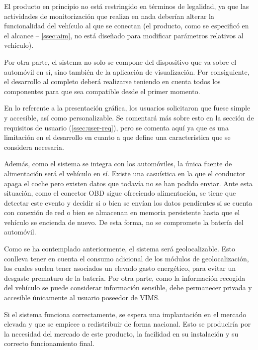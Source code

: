 El producto en principio no está restringido en términos de legalidad, ya que las
actividades de monitorización que realiza en nada deberían
alterar la funcionalidad del vehículo al que se conectan 
(el producto, como se especificó en el alcance
-- \ref{ssec:aim}, no está diseñado para modificar parámetros relativos al
vehículo).

Por otra parte, el sistema no solo se compone del dispositivo que va sobre el
automóvil en sí, sino también de la aplicación de visualización. Por
consiguiente, el desarrollo al completo deberá realizarse teniendo en cuenta
todos los componentes para que sea compatible desde el primer momento.

En lo referente a la presentación gráfica, los usuarios solicitaron que fuese
simple y accesible, así como personalizable. Se comentará más sobre esto en la
sección de requisitos de usuario (\ref{ssec:user-req}), pero se comenta aquí ya
que es una limitación en el desarrollo en cuanto a que define una característica
que se considera necesaria.

Además, como el sistema se integra con los automóviles, la única fuente de
alimentación será el vehículo en sí. Existe una casuística en la que el conductor apaga el
coche pero existen datos que todavía no se han podido enviar. Ante esta situación,
como el conector \ac{OBD} sigue ofreciendo alimentación, se tiene que detectar este
evento y decidir si o bien se envían los datos pendientes si se cuenta con conexión de red o
bien se almacenan en memoria persistente hasta que el vehículo se encienda de
nuevo. De esta forma, no se compromete la batería del automóvil.

Como se ha contemplado anteriormente, el sistema será geolocalizable. Esto
conlleva tener en cuenta el consumo adicional de los módulos de geolocalización,
los cuales suelen tener asociados un elevado gasto energético, para evitar
un desgaste prematuro de la batería. Por otra parte, como la información recogida
del vehículo se puede considerar información sensible, debe permanecer privada y 
accesible únicamente al usuario poseedor de \ac{VIMS}.

Si el sistema funciona correctamente, se espera una implantación en el mercado
elevada y que se empiece a redistribuir de forma nacional. Esto se produciría
por la necesidad del mercado de este producto, la facilidad en su instalación y
su correcto funcionamiento final.